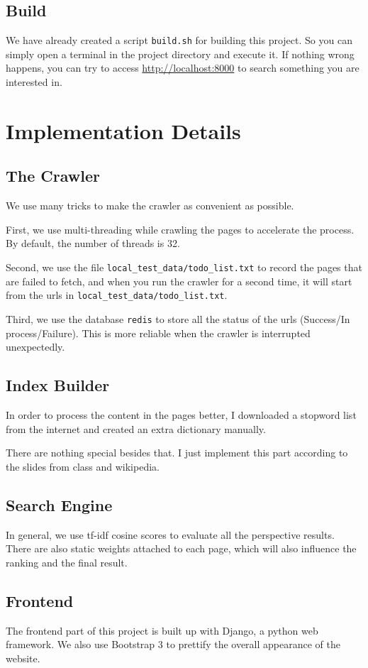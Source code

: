 \documentclass{article}
\begin{document}
\subsection{Build}

We have already created a script \texttt{build.sh} for building this project. So you can simply open a terminal in the project directory and execute it. If nothing wrong happens, you can try to access \url{http://localhost:8000} to search something you are interested in.

\section{Implementation Details}

\subsection{The Crawler}

We use many tricks to make the crawler as convenient as possible.

First, we use multi-threading while crawling the pages to accelerate the process. By default, the number of threads is 32.

Second, we use the file \texttt{local\_test\_data/todo\_list.txt} to record the pages that are failed to fetch, and when you run the crawler for a second time, it will start from the urls in \texttt{local\_test\_data/todo\_list.txt}.

Third, we use the database \texttt{redis} to store all the status of the urls (Success/In process/Failure). This is more reliable when the crawler is interrupted unexpectedly.

\subsection{Index Builder}

In order to process the content in the pages better, I downloaded a stopword list from the internet and created an extra dictionary manually.

There are nothing special besides that. I just implement this part according to the slides from class and wikipedia.

\subsection{Search Engine}

In general, we use tf-idf cosine scores to evaluate all the perspective results. There are also static weights attached to each page, which will also influence the ranking and the final result.

\subsection{Frontend}

The frontend part of this project is built up with Django, a python web framework. We also use Bootstrap 3 to prettify the overall appearance of the website.
\end{document}
